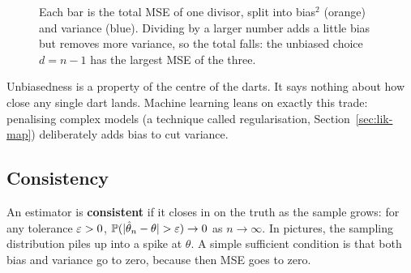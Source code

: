 \begin{figure}[H]
\centering
{}
\caption{Each bar is the total MSE of one divisor, split into bias$^2$ (orange) and variance
(blue). Dividing by a larger number adds a little bias but removes more variance, so the
total falls: the unbiased choice $d=n-1$ has the largest MSE of the three.}
\label{fig:lik-divisor-mse}
\end{figure}

Unbiasedness is a property of the centre of the darts. It says nothing about how close
any single dart lands. Machine learning leans on exactly this trade: penalising complex models (a technique called regularisation, Section~\ref{sec:lik-map}) deliberately adds bias to cut variance.

\subsection{Consistency}

An estimator is \textbf{consistent} if it closes in on the truth as the sample grows:
for any tolerance $\varepsilon>0$, $\operatorname{\mathbb{P}}(\lvert\hat\theta_n-\theta\rvert>\varepsilon)\to 0$ as $n\to\infty$.
In pictures, the sampling distribution piles up into a spike at $\theta$. A simple
sufficient condition is that both bias and variance go to zero, because then MSE goes
to zero.


